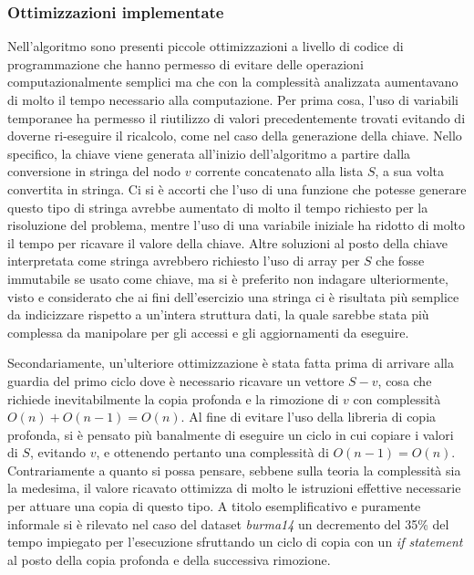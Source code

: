 \subsubsection{Ottimizzazioni implementate}

Nell'algoritmo sono presenti piccole ottimizzazioni a livello di codice di programmazione che hanno permesso di evitare delle operazioni computazionalmente semplici ma che con la complessità analizzata aumentavano di molto il tempo necessario alla computazione. Per prima cosa, l'uso di variabili temporanee ha permesso il riutilizzo di valori precedentemente trovati evitando di doverne ri-eseguire il ricalcolo, come nel caso della generazione della chiave. Nello specifico, la chiave viene generata all'inizio dell'algoritmo a partire dalla conversione in stringa del nodo \(v\) corrente concatenato alla lista \(S\), a sua volta convertita in stringa.
Ci si è accorti che l'uso di una funzione che potesse generare questo tipo di stringa avrebbe aumentato di molto il tempo richiesto per la risoluzione del problema, mentre l'uso di una variabile iniziale ha ridotto di molto il tempo per ricavare il valore della chiave.
Altre soluzioni al posto della chiave interpretata come stringa avrebbero richiesto l'uso di array per \(S\) che fosse immutabile se usato come chiave, ma si è preferito non indagare ulteriormente, visto e considerato che ai fini dell'esercizio una stringa ci è risultata più semplice da indicizzare rispetto a un'intera struttura dati, la quale sarebbe stata più complessa da manipolare per gli accessi e gli aggiornamenti da eseguire. 

Secondariamente, un'ulteriore ottimizzazione è stata fatta prima di arrivare alla guardia del primo ciclo dove è necessario ricavare un vettore \(S - {v}\), cosa che richiede inevitabilmente la copia profonda e la rimozione di \(v\) con complessità \(O(n) + O(n-1) = O(n)\). Al fine di evitare l'uso della libreria di copia profonda, si è pensato più banalmente di eseguire un ciclo in cui copiare i valori di \(S\), evitando \(v\), e ottenendo pertanto una complessità di \(O(n-1) = O(n)\). 
Contrariamente a quanto si possa pensare, sebbene sulla teoria la complessità sia la medesima, il valore ricavato ottimizza di molto le istruzioni effettive necessarie per attuare una copia di questo tipo. A titolo esemplificativo e puramente informale si è rilevato nel caso del dataset \textit{burma14} un decremento del 35\% del tempo impiegato per l'esecuzione sfruttando un ciclo di copia con un \textit{if statement} al posto della copia profonda e della successiva rimozione. 


